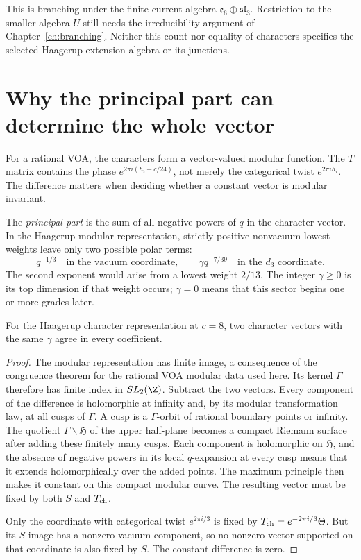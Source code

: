 \begin{example}
This is branching under the finite current algebra
$\mathfrak e_6\oplus\mathfrak{sl}_3$. Restriction to the smaller
algebra $U$ still needs the irreducibility argument of
Chapter~\ref{ch:branching}. Neither this count nor equality of
characters specifies the selected Haagerup extension algebra
or its junctions.
\end{example}

\section{Why the principal part can determine the whole vector}

For a rational VOA, the characters form a vector-valued modular
function. The $T$ matrix contains the phase
$e^{2\pi i(h_i-c/24)}$, not merely the categorical twist
$e^{2\pi ih_i}$. The difference matters when deciding whether a
constant vector is modular invariant.

The \emph{principal part} is the sum of all negative powers of
$q$ in the character vector. In the Haagerup modular representation,
strictly positive nonvacuum lowest weights leave only two possible
polar terms:
\[
 q^{-1/3}\quad\text{in the vacuum coordinate},\qquad
 \gamma q^{-7/39}\quad\text{in the $d_3$ coordinate}.
\]
The second exponent would arise from a lowest weight $2/13$.
The integer $\gamma\ge0$ is its top dimension if that weight occurs;
$\gamma=0$ means that this sector begins one or more grades later.

\begin{proposition}
\label{prop:char-unique}
For the Haagerup character representation at $c=8$, two character
vectors with the same $\gamma$ agree in every coefficient.
\end{proposition}
\begin{proof}
The modular representation has finite image, a consequence of the
congruence theorem for the rational VOA modular data used here.
Its kernel $\Gamma$ therefore has finite index in $SL_2(\Z)$.
Subtract the two vectors. Every component of the difference is
holomorphic at infinity and, by its modular transformation law,
at all cusps of $\Gamma$. A cusp is a $\Gamma$-orbit of rational
boundary points or infinity. The quotient
$\Gamma\backslash\mathfrak H$ of the upper half-plane becomes a
compact Riemann surface after adding these finitely many cusps.
Each component is holomorphic on $\mathfrak H$, and the absence of
negative powers in its local $q$-expansion at every cusp means that
it extends holomorphically over the added points. The maximum
principle then makes it constant on this compact modular curve.
The resulting vector must be fixed by both $S$ and $T_{\rm ch}$.

Only the coordinate with categorical twist $e^{2\pi i/3}$ is fixed
by $T_{\rm ch}=e^{-2\pi i/3}\Theta$. But its $S$-image has a
nonzero vacuum component, so no nonzero vector supported on that
coordinate is also fixed by $S$. The constant difference is zero.
\end{proof}

